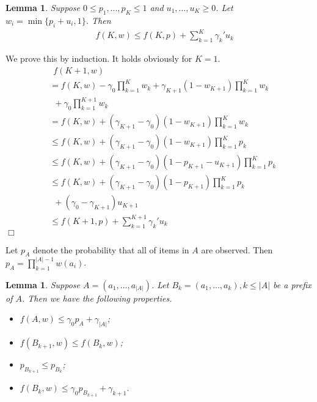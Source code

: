 \documentclass{article}
\newcommand{\abs}[1]{\left| #1 \right|}
\newtheorem{lemma}[theorem]{Lemma}%
\newenvironment{proof}{\noindent {\textbf{Proof. }}}{$\Box$ \medskip}
\begin{document}
\begin{lemma}
\label{lem:estimateTech}
Suppose $0 \leq p_1,...,p_K \leq 1$ and $u_1,...,u_K \geq 0$. Let $w_i = \min\{p_i + u_i, 1\}$. Then
\begin{align*}
&~~f(K, w) \leq f(K, p) + \sum_{k=1}^{K} \gamma_k' u_k
\end{align*}
\end{lemma}
\begin{proof}
We prove this by induction. It holds obviously for $K=1$.
\begin{align*}
&~~f(K+1, w)\\
&= f(K, w) -\gamma_0 \prod_{k=1}^{K} w_k + \gamma_{K+1} (1 - w_{K+1}) \prod_{k=1}^{K} w_k\\
&~~ + \gamma_0 \prod_{k=1}^{K+1} w_k\\
&= f(K, w) + (\gamma_{K+1} - \gamma_0) (1 - w_{K+1}) \prod_{k=1}^{K} w_k\\
&\leq f(K, w) + (\gamma_{K+1} - \gamma_0) (1 - w_{K+1}) \prod_{k=1}^{K} p_k\\
&\leq f(K, w) + (\gamma_{K+1} - \gamma_0) (1 - p_{K+1} - u_{K+1}) \prod_{k=1}^{K} p_k\\
&\leq f(K, w) + (\gamma_{K+1} - \gamma_0) (1 - p_{K+1}) \prod_{k=1}^{K} p_k\\
&~~ + (\gamma_0 - \gamma_{K+1}) u_{K+1}\\
&\leq f(K+1, p) + \sum_{k=1}^{K+1} \gamma_k' u_k
\end{align*}
\end{proof}
	
Let $p_A$ denote the probability that all of items in $A$ are observed. Then $p_A = \prod_{k=1}^{\abs{A}-1}w(a_i)$.

\begin{lemma}
Suppose $A = (a_1, ..., a_{\abs{A}})$. Let $B_k = (a_1, ..., a_k), k \leq \abs{A}$ be a prefix of $A$. Then we have the following properties.
\begin{itemize}
\item[(1)] $f(A, w) \leq \gamma_0 p_A + \gamma_{\abs{A}}$;
\item[(2)] $f(B_{k+1}, w) \leq f(B_k, w)$;
\item[(3)] $p_{B_{k+1}} \leq p_{B_k}$;
\item[(4)] $f(B_k, w) \leq \gamma_0 p_{B_{k+1}} + \gamma_{k+1}$.
\end{itemize}	
\end{lemma}
\end{document}
